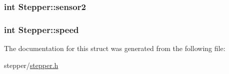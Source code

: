 \subsubsection[{\texorpdfstring{sensor2}{sensor2}}]{\setlength{\rightskip}{0pt plus 5cm}int Stepper\+::sensor2}\hypertarget{structStepper_aefcdad417a6a9a606ef5dfc86f0d5bbf}{}\label{structStepper_aefcdad417a6a9a606ef5dfc86f0d5bbf}
\subsubsection[{\texorpdfstring{speed}{speed}}]{\setlength{\rightskip}{0pt plus 5cm}int Stepper\+::speed}\hypertarget{structStepper_a79adf80b4bfffb08803fc2e0e8da4558}{}\label{structStepper_a79adf80b4bfffb08803fc2e0e8da4558}


The documentation for this struct was generated from the following file\+:\begin{DoxyCompactItemize}
\item 
stepper/\hyperlink{stepper_8h}{stepper.\+h}\end{DoxyCompactItemize}

